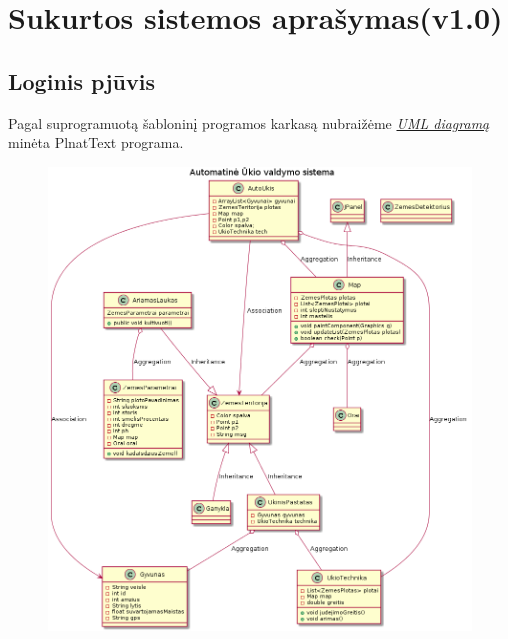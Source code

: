 \documentclass[oneside]{VUMIFPSkursinis}
\begin{document}
\section{Sukurtos sistemos aprašymas(v1.0)}

\subsection{Loginis pjūvis}
Pagal suprogramuotą šabloninį programos karkasą nubraižėme  \hyperref[fig:uml]{\textit{ UML diagramą}} minėta PlnatText programa.

	\begin{figure}[H]	
	\centering	
		\includegraphics[width=\textwidth,height=\textheight,keepaspectratio]{uml.png}	
		\caption{}
		\label{fig:uml}
	\end{figure}
\end{document}
